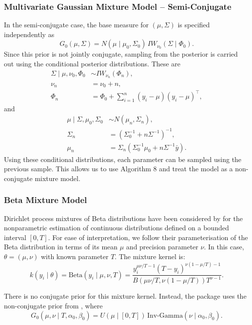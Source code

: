 \documentclass[nojss]{jss}
\begin{document}
\subsubsection{Multivariate Gaussian Mixture Model -- Semi-Conjugate}
In the semi-conjugate case, the base measure for $(\mu, \Sigma)$ is specified independently as
\begin{equation*}
G_0(\mu, \Sigma) = N(\mu \mid \mu_0, \Sigma_0)\, IW_{\nu_0}(\Sigma \mid \Phi_0).
\end{equation*}
Since this prior is not jointly conjugate, sampling from the posterior is carried out using the
conditional posterior distributions. These are
\begin{align*}
\Sigma \mid \mu, \nu_0, \Phi_0
&\sim IW_{\nu_n}(\Phi_n), \\
\nu_n
&= \nu_0 + n, \\
\Phi_n
&= \Phi_0 + \sum_{i=1}^n (y_i - \mu)(y_i - \mu)^\top,
\end{align*}
and
\begin{align*}
\mu \mid \Sigma, \mu_0, \Sigma_0
&\sim N(\mu_n, \Sigma_n), \\
\Sigma_n
&= \left(\Sigma_0^{-1} + n \Sigma^{-1}\right)^{-1}, \\
\mu_n
&= \Sigma_n \left(\Sigma_0^{-1}\mu_0 + n \Sigma^{-1}\bar{y}\right).
\end{align*}
Using these conditional distributions, each parameter can be sampled using the previous
sample. This allows us to use Algorithm 8 and treat the model as a non-conjugate mixture model.

\subsubsection{Beta Mixture Model}
Dirichlet process mixtures of Beta distributions have been considered by \citet{kottas_nonparametric_2006}
for the nonparametric estimation of continuous distributions defined on a bounded interval $[0, T]$.
For ease of interpretation, we follow their parameterisation of the Beta distribution in terms of its
mean $\mu$ and precision parameter $\nu$. In this case, $\theta = (\mu, \nu)$ with known parameter $T$.
The mixture kernel is:
\begin{equation*}
k(y_i \mid \theta) = \text{Beta}(y_i \mid \mu, \nu, T) =
\frac{y_i^{\mu \nu / T - 1}(T-y_i)^{\nu(1-\mu/T)-1}}
{B(\mu \nu / T, \nu(1-\mu/T))T^{\nu-1}}.
\end{equation*}

There is no conjugate prior for this mixture kernel. Instead, the  package
uses the non-conjugate prior from \citet{kottas_nonparametric_2006}, where
\begin{equation*}
G_0(\mu, \nu \mid T, \alpha_0, \beta_0) =
U(\mu \mid [0,T]) \, \text{Inv-Gamma}(\nu \mid \alpha_0, \beta_0).
\end{equation*}
\end{document}
